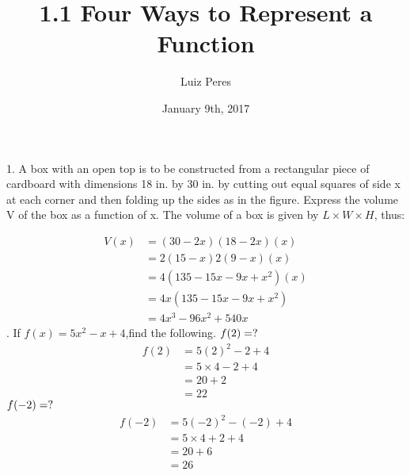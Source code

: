 \documentclass{article}
\title{1.1 Four Ways to Represent a Function}
\author{Luiz Peres}
\date{January 9th, 2017}
\begin{document}
\begin{titlepage}
\maketitle
\end{titlepage}

1. A box with an open top is to be constructed from a rectangular piece of cardboard with dimensions 18 in. by 30 in. by cutting out equal squares of side x at each corner and then folding up the sides as in the figure. Express the volume V of the box as a function of x.
\newline\newline
The volume of a box is given by $L \times W \times H$, thus:

\begin{equation}
\begin{split}
    V(x) & = (30 - 2x)(18 - 2x) (x) \\
    & = 2(15 - x) 2(9 - x) (x) \\ 
    & = 4(135 - 15x - 9x + x^2) (x) \\
    & = 4x(135 - 15x - 9x + x^2) \\
    & = 4x^3 -96x^2 + 540x 
\end{split}
\end{equation}
\newline{}. If $f(x) = 5x^2 - x + 4$,find the following.
\newline\newline$f(2) = \space ?$
\begin{equation}
\begin{split}
    f(2) & = 5(2)^2 - 2 + 4 \\
    & = 5 \times 4 - 2 + 4 \\
    & = 20 + 2 \\
    & = 22
\end{split}
\end{equation}
\newline\newline
$f(-2) = \space ?$
\begin{equation}
\begin{split}
    f(-2) & = 5(-2)^2 - (-2) + 4 \\
    & = 5 \times 4 + 2 + 4 \\
    & = 20 + 6 \\
    & = 26
\end{split}
\end{equation}
\newline\newline
\end{document}
